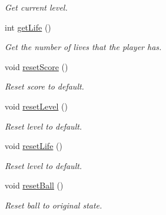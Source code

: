 \begin{DoxyCompactItemize}
\begin{DoxyCompactList}\small\item\em Get current level. \end{DoxyCompactList}\item 
\mbox{\label{class_game_setting_acb73d6c9dcdba67b4d4d52ddccb1fa93}} 
int \mbox{\hyperlink{class_game_setting_acb73d6c9dcdba67b4d4d52ddccb1fa93}{get\+Life}} ()
\begin{DoxyCompactList}\small\item\em Get the number of lives that the player has. \end{DoxyCompactList}\item 
\mbox{\label{class_game_setting_a458d0b7092d289f33995d9b8caecd7e4}} 
void \mbox{\hyperlink{class_game_setting_a458d0b7092d289f33995d9b8caecd7e4}{reset\+Score}} ()
\begin{DoxyCompactList}\small\item\em Reset score to default. \end{DoxyCompactList}\item 
\mbox{\label{class_game_setting_aa44bf51618371012ce629c540c43b053}} 
void \mbox{\hyperlink{class_game_setting_aa44bf51618371012ce629c540c43b053}{reset\+Level}} ()
\begin{DoxyCompactList}\small\item\em Reset level to default. \end{DoxyCompactList}\item 
\mbox{\label{class_game_setting_a579edffd28cf6b035b7704ac987e3a8d}} 
void \mbox{\hyperlink{class_game_setting_a579edffd28cf6b035b7704ac987e3a8d}{reset\+Life}} ()
\begin{DoxyCompactList}\small\item\em Reset level to default. \end{DoxyCompactList}\item 
\mbox{\label{class_game_setting_a6b47ced165cd818716931ed06b5156a5}} 
void \mbox{\hyperlink{class_game_setting_a6b47ced165cd818716931ed06b5156a5}{reset\+Ball}} ()
\begin{DoxyCompactList}\small\item\em Reset ball to original state. \end{DoxyCompactList}\end{DoxyCompactItemize}
